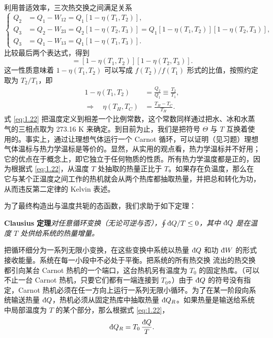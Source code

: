 利用普适效率，三次热交换之间满足关系
\begin{equation*}
\left\{
\begin{aligned}
Q_2&=Q_1-W_{12}=Q_1[1-\eta(T_1,T_2)],\\
Q_3&=Q_2-W_{23}=Q_2[1-\eta(T_2,T_3)]=Q_1[1-\eta(T_1,T_2)][1-\eta(T_2,T_3)],\\
Q_3&=Q_1-W_{13}=Q_1[1-\eta(T_1,T_3)].
\end{aligned}
\right.
\end{equation*}
比较最后两个表达式，得到
\begin{equation}
[1-\eta(T_1,T_3)]=[1-\eta(T_1,T_2)][1-\eta(T_2,T_3)].
\label{eq:1.21}
\end{equation}
这一性质意味着 $1-\eta(T_1,T_2)$ 可以写成 $f(T_2)/f(T_1)$ 形式的比值，按照约定取为 $T_2/T_1$，即
\begin{equation}
\begin{aligned}
1-\eta(T_1,T_2)&=\frac{Q_2}{Q_1}\equiv\frac{T_2}{T_1},\\
\Longrightarrow\quad\eta(T_H,T_C)&=\frac{T_H-T_C}{T_H}.
\end{aligned}
\label{eq:1.22}
\end{equation}
式 \eqref{eq:1.22} 把温度定义到相差一个比例常数，这个常数同样通过把水、冰和水蒸气的三相点取为 273.16 K 来确定。到目前为止，我们是把符号 $\Theta$ 与 $T$ 互换着使用的。事实上，通过让理想气体运行一个 Carnot 循环，可以证明（见习题）理想气体温标与热力学温标是等价的。显然，从实用的观点看，热力学温标并不好用；它的优点在于概念上，即它独立于任何物质的性质。所有热力学温度都是正的，因为根据式 \eqref{eq:1.22}，从温度 $T$ 处抽取的热量正比于 $T$。如果存在负温度，那么在它与某个正温度之间工作的热机就会从两个热库都抽取热量，并把总和转化为功，从而违反第二定律的 Kelvin 表述。


为了最终构造出与温度共轭的态函数，我们求助于如下定理：

\textbf{Clausius 定理}\quad\emph{对任意循环变换（无论可逆与否），$\oint\inexd Q/T\le0$，其中 $\inexd Q$ 是在温度 $T$ 处供给系统的热量增量。}

把循环细分为一系列无限小变换，在这些变换中系统以热量 $\inexd Q$ 和功 $\inexd W$ 的形式接收能量。系统在每一小段中不必处于平衡。把系统的所有热交换
流出的热交换都引向某台 Carnot 热机的一个端口，这台热机另有温度为 $T_0$ 的固定热库。（可以不止一台 Carnot 热机，只要它们都有一端连接到 $T_0$。）由于 $\inexd Q$ 的符号没有指定，Carnot 热机必须在任一方向上运行一系列无限小循环。为了在某一阶段向系统输送热量 $\inexd Q$，热机必须从固定热库中抽取热量 $\inexd Q_R$。如果热量是输送给系统中局部温度为 $T$ 的某个部分，那么根据式 \eqref{eq:1.22}，
\begin{equation}
\inexd Q_R=T_0\,\frac{\inexd Q}{T}.
\label{eq:1.23}
\end{equation}

